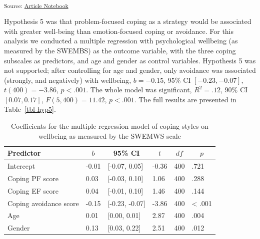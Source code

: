 \documentclass[
  man,
  longtable,
  nolmodern,
  notxfonts,
  notimes,
  colorlinks=true,linkcolor=blue,citecolor=blue,urlcolor=blue]{apa7}
\begin{document}
\textsubscript{Source:
\href{https://deborahapthorp.github.io/Amy_ClimateScientists/index.qmd.html}{Article
Notebook}}

Hypothesis 5 was that problem-focused coping as a strategy would be
associated with greater well-being than emotion-focused coping or
avoidance. For this analysis we conducted a multiple regression with
psychological wellbeing (as measured by the SWEMBS) as the outcome
variable, with the three coping subscales as predictors, and age and
gender as control variables. Hypothesis 5 was not supported; after
controlling for age and gender, only avoidance was associated (strongly,
and negatively) with wellbeing, \(b = -0.15\), 95\% CI
\([-0.23, -0.07]\), \(t(400) = -3.86\), \(p < .001\). The whole model
was significant, \(R^2 = .12\), 90\% CI \([0.07, 0.17]\),
\(F(5, 400) = 11.42\), \(p < .001\). The full results are presented in
Table~\ref{tbl-hyp5}.

\begin{table}

{\caption{{}{\label{tbl-hyp5}}}
\vspace{-20pt}}

\begin{center}
\begin{threeparttable}

\caption{\label{tab:tbl-hyp5}Coefficients for the multiple regression model of coping styles on wellbeing as measured by the SWEMWS scale}

\begin{tabular}{llllll}
\toprule
Predictor & \multicolumn{1}{c}{$b$} & \multicolumn{1}{c}{95\% CI} & \multicolumn{1}{c}{$t$} & \multicolumn{1}{c}{$\mathit{df}$} & \multicolumn{1}{c}{$p$}\\
\midrule
Intercept & -0.01 & {}[-0.07, 0.05] & -0.36 & 400 & .721\\
Coping PF score & 0.03 & {}[-0.03, 0.10] & 1.06 & 400 & .288\\
Coping EF score & 0.04 & {}[-0.01, 0.10] & 1.46 & 400 & .144\\
Coping avoidance score & -0.15 & {}[-0.23, -0.07] & -3.86 & 400 & < .001\\
Age & 0.01 & {}[0.00, 0.01] & 2.87 & 400 & .004\\
Gender & 0.13 & {}[0.03, 0.22] & 2.51 & 400 & .012\\
\bottomrule
\end{tabular}

\end{threeparttable}
\end{center}

\end{table}
\end{document}
